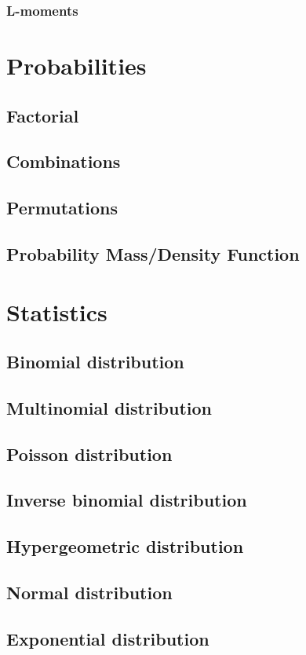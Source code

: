 \documentclass{report}
\begin{document}
		\subsection{L-moments}

\chapter{Probabilities}
	\section{Factorial}
	\section{Combinations}
	\section{Permutations}
	\section{Probability Mass/Density Function}

\chapter{Statistics}
	\section{Binomial distribution}
	\section{Multinomial distribution}
	\section{Poisson distribution}
	\section{Inverse binomial distribution}
	\section{Hypergeometric distribution}
	\section{Normal distribution}
	\section{Exponential distribution}
\end{document}
